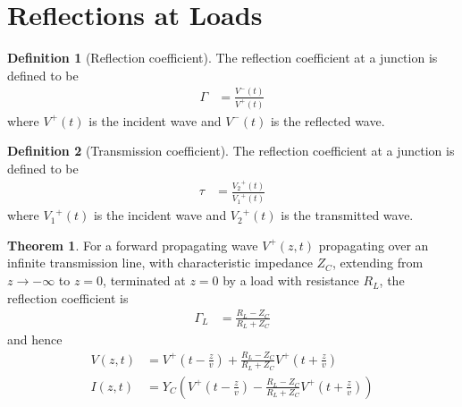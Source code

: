 \documentclass[titlepage, fleqn, a4paper, 12pt, twoside]{article}
\theoremstyle{definition}
\newtheorem{definition}{Definition}
\theoremstyle{theorem}
\newtheorem{theorem}{Theorem}
\begin{document}
\begin{solution}
\begin{enumerate}
\begin{figure}[H]
			\end{figure}
	\end{enumerate}
\end{solution}

\section{Reflections at Loads}

\begin{definition}[Reflection coefficient]
	The reflection coefficient at a junction is defined to be
	\begin{align*}
		\Gamma &= \frac{V^-(t)}{V^+(t)}
	\end{align*}
	where $V^+(t)$ is the incident wave and $V^-(t)$ is the reflected wave.
\end{definition}

\begin{definition}[Transmission coefficient]
	The reflection coefficient at a junction is defined to be
	\begin{align*}
		\tau &= \frac{{V_2}^+(t)}{{V_1}^+(t)}
	\end{align*}
	where ${V_1}^+(t)$ is the incident wave and ${V_2}^+(t)$ is the transmitted wave.
\end{definition}

\begin{theorem}
	For a forward propagating wave $V^+(z,t)$ propagating over an infinite transmission line, with characteristic impedance $Z_C$, extending from $z \to -\infty$ to $z = 0$, terminated at $z = 0$ by a load with resistance $R_L$, the reflection coefficient is
	\begin{align*}
		\Gamma_L &= \frac{R_L - Z_C}{R_L + Z_C}
	\end{align*}
	and hence
	\begin{align*}
		V(z,t) &= V^+\left( t - \frac{z}{v} \right) + \frac{R_L - Z_C}{R_L + Z_C} V^+\left( t + \frac{z}{v} \right)\\
		I(z,t) &= Y_C \left( V^+\left( t - \frac{z}{v} \right) - \frac{R_L - Z_C}{R_L + Z_C} V^+\left( t + \frac{z}{v} \right) \right)
	\end{align*}
\end{theorem}
\end{document}
